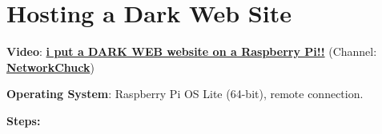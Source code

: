\section{Hosting a Dark Web Site}

\textbf{Video}: \href{https://www.youtube.com/watch?v=bllS9tkCkaM}{\textbf{\color{blue}i put a DARK WEB website on a Raspberry Pi!!}} (Channel: \href{https://www.youtube.com/@NetworkChuck}{\textbf{\color{blue}NetworkChuck}})

\vspace{0.5cm}

\noindent \textbf{Operating System}: Raspberry Pi OS Lite (64-bit), remote connection.

\vspace{0.5cm}

\noindent \textbf{Steps:}

